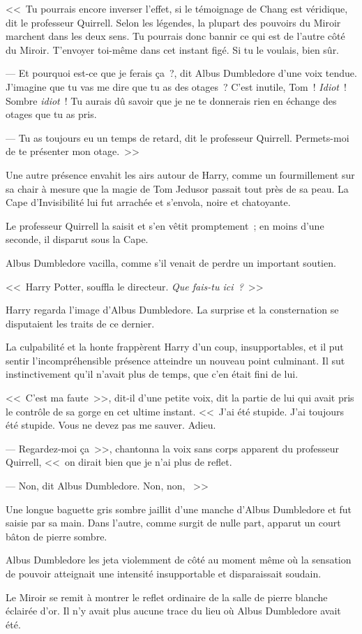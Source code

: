 <<~Tu pourrais encore inverser l'effet, si le témoignage de Chang est véridique, dit le professeur Quirrell. Selon les légendes, la plupart des pouvoirs du Miroir marchent dans les deux sens. Tu pourrais donc bannir ce qui est de l'autre côté du Miroir. T'envoyer toi-même dans cet instant figé. Si tu le voulais, bien sûr.

--- Et pourquoi est-ce que je ferais ça~?, dit Albus Dumbledore d'une voix tendue. J'imagine que tu vas me dire que tu as des otages~? C'est inutile, Tom~! \emph{Idiot}~! Sombre \emph{idiot}~! Tu aurais dû savoir que je ne te donnerais rien en échange des otages que tu as pris.

--- Tu as toujours eu un temps de retard, dit le professeur Quirrell. Permets-moi de te présenter mon otage.~>>

Une autre présence envahit les airs autour de Harry, comme un fourmillement sur sa chair à mesure que la magie de Tom Jedusor passait tout près de sa peau. La Cape d'Invisibilité lui fut arrachée et s'envola, noire et chatoyante.

Le professeur Quirrell la saisit et s'en vêtit promptement~; en moins d'une seconde, il disparut sous la Cape.

Albus Dumbledore vacilla, comme s'il venait de perdre un important soutien.

<<~Harry Potter, souffla le directeur. \emph{Que fais-tu ici~?}~>>

Harry regarda l'image d'Albus Dumbledore. La surprise et la consternation se disputaient les traits de ce dernier.

La culpabilité et la honte frappèrent Harry d'un coup, insupportables, et il put sentir l'incompréhensible présence atteindre un nouveau point culminant. Il sut instinctivement qu'il n'avait plus de temps, que c'en était fini de lui.

<<~C'est ma faute~>>, dit-il d'une petite voix, dit la partie de lui qui avait pris le contrôle de sa gorge en cet ultime instant. <<~J'ai été stupide. J'ai toujours été stupide. Vous ne devez pas me sauver. Adieu.

--- Regardez-moi ça~>>, chantonna la voix sans corps apparent du professeur Quirrell, <<~on dirait bien que je n'ai plus de reflet.

--- Non, dit Albus Dumbledore. Non, non, ~>>~

Une longue baguette gris sombre jaillit d'une manche d'Albus Dumbledore et fut saisie par sa main. Dans l'autre, comme surgit de nulle part, apparut un court bâton de pierre sombre.

Albus Dumbledore les jeta violemment de côté au moment même où la sensation de pouvoir atteignait une intensité insupportable et disparaissait soudain.

Le Miroir se remit à montrer le reflet ordinaire de la salle de pierre blanche éclairée d'or. Il n'y avait plus aucune trace du lieu où Albus Dumbledore avait été.
